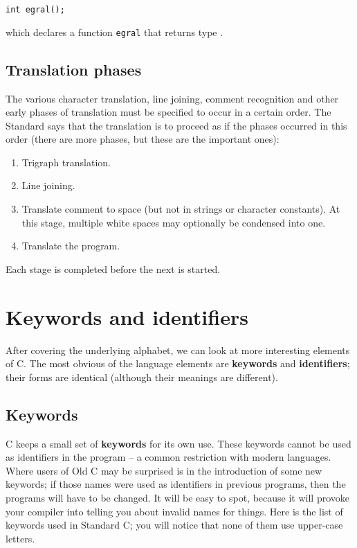    \begin{Verbatim}
int egral();
\end{Verbatim}

   which declares a function \texttt{egral} that returns type
    \kint.


  

  \subsection{Translation phases}
   

   The various character translation, line joining, comment recognition
    and other early phases of translation must be specified to occur in a
    certain order. The Standard says that the translation is to proceed as if
    the phases occurred in this order (there are more phases, but these are
    the important ones):


   \begin{enumerate}
    \item Trigraph translation.
    \item Line joining.
    \item Translate comment to space (but not in strings or character
     constants). At this stage, multiple white spaces may optionally be
     condensed into one.
    \item Translate the program.
   \end{enumerate}

   Each stage is completed before the next is started.


  

 
        \section{Keywords and identifiers}
        

  

  After covering the underlying alphabet, we can look at more interesting
   elements of C. The most obvious of the language elements are
   \textbf{keywords} and \textbf{identifiers}; their forms are identical
   (although their meanings are different).


  \subsection{Keywords}
   

   C keeps a small set of \textbf{keywords} for its own use. These
    keywords cannot be used as identifiers in the program -- a common
    restriction with modern languages. Where users of Old C may be surprised
    is in the introduction of some new keywords; if those names were used as
    identifiers in previous programs, then the programs will have to be
    changed. It will be easy to spot, because it will provoke your compiler
    into telling you about invalid names for things. Here is the list of
    keywords used in Standard C; you will notice that none of them use
    upper-case letters.

